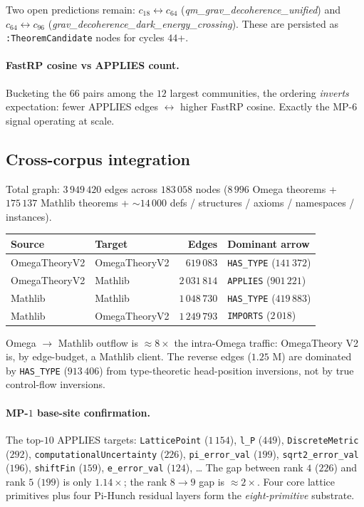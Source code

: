 \documentclass[11pt]{article}
\begin{document}
Two open predictions remain: $c_{18}\leftrightarrow c_{64}$
(\emph{qm\_grav\_decoherence\_unified}) and $c_{64}\leftrightarrow c_{96}$
(\emph{grav\_decoherence\_dark\_energy\_crossing}). These are
persisted as \lstinline|:TheoremCandidate| nodes for cycles $44$+.

\paragraph{FastRP cosine vs APPLIES count.}
Bucketing the $66$ pairs among the $12$ largest communities, the
ordering \emph{inverts} expectation: fewer APPLIES edges
$\leftrightarrow$ higher FastRP cosine. Exactly the MP-$6$ signal
operating at scale.

\subsection{Cross-corpus integration}
\label{sec:exp-crosscorpus}

Total graph: $3\,949\,420$ edges across $183\,058$ nodes
($8\,996$ Omega theorems + $175\,137$ Mathlib theorems + $\sim 14\,000$
defs / structures / axioms / namespaces / instances).

\begin{table}[h]
\centering\small
\begin{tabular}{l l r l}
\toprule
Source & Target & Edges & Dominant arrow \\
\midrule
OmegaTheoryV2 & OmegaTheoryV2 & $619\,083$  & \lstinline|HAS_TYPE| ($141\,372$) \\
OmegaTheoryV2 & Mathlib       & $2\,031\,814$ & \lstinline|APPLIES| ($901\,221$) \\
Mathlib       & Mathlib       & $1\,048\,730$ & \lstinline|HAS_TYPE| ($419\,883$) \\
Mathlib       & OmegaTheoryV2 & $1\,249\,793$ & \lstinline|IMPORTS| ($2\,018$) \\
\bottomrule
\end{tabular}
\end{table}

Omega $\to$ Mathlib outflow is $\approx 8\times$ the intra-Omega
traffic: OmegaTheory V2 is, by edge-budget, a Mathlib client. The
reverse edges ($1.25$ M) are dominated by \lstinline|HAS_TYPE|
($913\,406$) from type-theoretic head-position inversions, not by true
control-flow inversions.

\paragraph{MP-$1$ base-site confirmation.}
The top-$10$ APPLIES targets:
\lstinline|LatticePoint| ($1\,154$),
\lstinline|l_P| ($449$),
\lstinline|DiscreteMetric| ($292$),
\lstinline|computationalUncertainty| ($226$),
\lstinline|pi_error_val| ($199$),
\lstinline|sqrt2_error_val| ($196$),
\lstinline|shiftFin| ($159$),
\lstinline|e_error_val| ($124$), \ldots
The gap between rank $4$ ($226$) and rank $5$ ($199$) is only $1.14\times$;
the rank $8\!\to\!9$ gap is $\approx 2\times$. Four core lattice
primitives plus four Pi-Hunch residual layers form the
\emph{eight-primitive} substrate.
\end{document}
